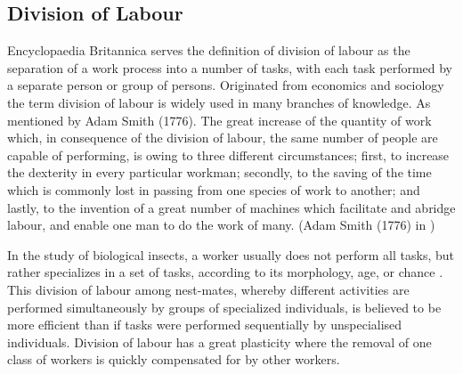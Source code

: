 

\subsection{Division of Labour}
Encyclopaedia Britannica serves the definition of division of labour as the separation of a work process into a number of tasks, with each task performed by a separate person or group of persons. Originated from economics and sociology the term division of labour is widely used in many branches of knowledge. As mentioned by Adam Smith (1776).
The great increase of the quantity of work which, in consequence of the division of labour, the same number of people are capable of performing, is owing to three different circumstances; first, to increase the dexterity in every particular workman; secondly, to the saving of the time which is commonly lost in passing from one species of work to another; and lastly, to the invention of a great number of machines which facilitate and abridge labour, and   enable one man to do the work of many. (Adam Smith (1776) in \cite{Sendova-Franks+1999})

In the study of biological insects, a worker usually does not perform all tasks, but rather specializes in a set of tasks, according to its morphology, age, or chance \cite{Bonabeau+1999}. This division of labour among nest-mates, whereby different activities are performed simultaneously by groups of specialized individuals, is believed to be more efficient than if tasks were performed sequentially by unspecialised individuals. Division of  labour has a great plasticity where the removal of one class of workers is quickly compensated for by other workers.

